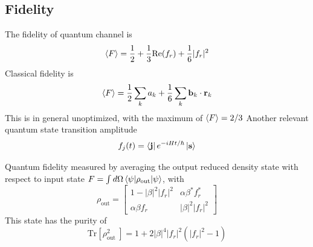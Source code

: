 \documentclass[../../../main.tex]{subfiles}
\begin{document}
\subsection{Fidelity}
The fidelity of quantum channel is
\begin{equation*}
  \braket{F }  = \frac{1 }{2 } + \frac{1 }{3} \mathrm{Re} (f_r) +\frac{1 }{6 }|f_r|^2
\end{equation*}
Classical fidelity is
\begin{equation*}
  \braket{F } = \frac{1 }{2 } \sum_{k}a_k + \frac{1 }{6 }\sum_{k } \mathbf{b }_k \cdot \mathbf{r}_k
\end{equation*}
This is in general unoptimized, with the maximum of $\braket{F} = 2/3$
Another relevant quantum state transition amplitude
\begin{equation*}
  f_j(t) = \bra{\mathbf{j}} e ^{-iHt/\hbar }\ket{\mathbf{s}}
\end{equation*}

Quantum fidelity measured by averaging the output reduced density state with respect to input state $F=\int d\Omega \braket{\psi | \rho_\text{out}|\psi}$, with
\begin{equation*}
  \rho_\text{out}
  = \begin{bmatrix}
    1- |\beta|^2 |f_r|^2 & \alpha\beta^*  f_r^* \\
    \alpha\beta  f_r     & |\beta|^2 |f_r|^2
  \end{bmatrix}
\end{equation*}
This state has the purity of
\begin{equation*}
  \mathrm{Tr} [\rho_\text{out }^2] = 1+ 2|\beta|^{4}|f_{r}|^{2}(|f_r| ^2 -1)
\end{equation*}
\end{document}

